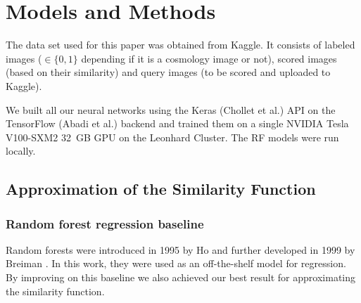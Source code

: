 \documentclass[10pt,conference,compsocconf]{IEEEtran}
\begin{document}


\section{Models and Methods} \label{sec:models_methods}
The data set used for this paper was obtained from Kaggle. It consists of labeled images ($\in \{0,1\}$ depending if it is a cosmology image or not), scored images (based on their similarity) and query images (to be scored and uploaded to Kaggle).

We built all our neural networks using the Keras (Chollet et al.\@ \cite{chollet2015keras}) API on the TensorFlow (Abadi et al.\@ \cite{tensorflow2015-whitepaper}) backend and trained them on a single NVIDIA Tesla V100-SXM2 \SI{32}{GB} GPU on the Leonhard Cluster. The RF models were run locally.

\subsection{Approximation of the Similarity Function}

\subsubsection{Random forest regression baseline} 
Random forests were introduced in 1995 by Ho \cite{Ho} and further developed in 1999 by Breiman \cite{Breiman}. In this work, they were used as an off-the-shelf model for regression. By improving on this baseline we also achieved our best result for approximating the similarity function. 
\end{document}
